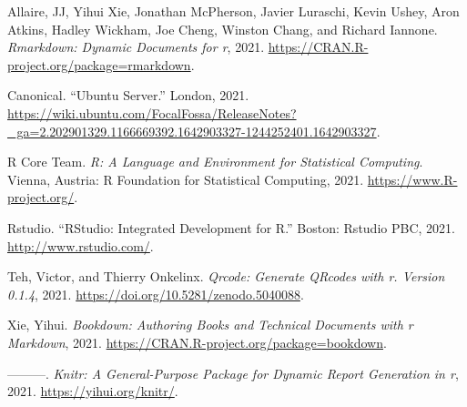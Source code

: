 \documentclass[
]{book}
\newlength{\cslhangindent}
\newlength{\cslentryspacingunit} %
\newenvironment{CSLReferences}[2] %
 {%
  \setlength{\parindent}{0pt}
  \ifodd #1
  \let\oldpar\par
  \def\par{\hangindent=\cslhangindent\oldpar}
  \fi
  \setlength{\parskip}{#2\cslentryspacingunit}
 }%
 {}
\begin{document}
\hypertarget{refs}{}
\begin{CSLReferences}{1}{0}
\leavevmode{}%
Allaire, JJ, Yihui Xie, Jonathan McPherson, Javier Luraschi, Kevin Ushey, Aron Atkins, Hadley Wickham, Joe Cheng, Winston Chang, and Richard Iannone. \emph{Rmarkdown: Dynamic Documents for r}, 2021. \url{https://CRAN.R-project.org/package=rmarkdown}.

\leavevmode{}%
Canonical. {``Ubuntu {Server}.''} London, 2021. \url{https://wiki.ubuntu.com/FocalFossa/ReleaseNotes?_ga=2.202901329.1166669392.1642903327-1244252401.1642903327}.

\leavevmode{}%
R Core Team. \emph{R: A Language and Environment for Statistical Computing}. Vienna, Austria: R Foundation for Statistical Computing, 2021. \url{https://www.R-project.org/}.

\leavevmode{}%
Rstudio. {``{RStudio}: {Integrated} {Development} for {R}.''} Boston: Rstudio PBC, 2021. \url{http://www.rstudio.com/}.

\leavevmode{}%
Teh, Victor, and Thierry Onkelinx. \emph{Qrcode: Generate QRcodes with r. Version 0.1.4}, 2021. \url{https://doi.org/10.5281/zenodo.5040088}.

\leavevmode{}%
Xie, Yihui. \emph{Bookdown: Authoring Books and Technical Documents with r Markdown}, 2021. \url{https://CRAN.R-project.org/package=bookdown}.

\leavevmode{}%
---------. \emph{Knitr: A General-Purpose Package for Dynamic Report Generation in r}, 2021. \url{https://yihui.org/knitr/}.

\end{CSLReferences}
\end{document}
